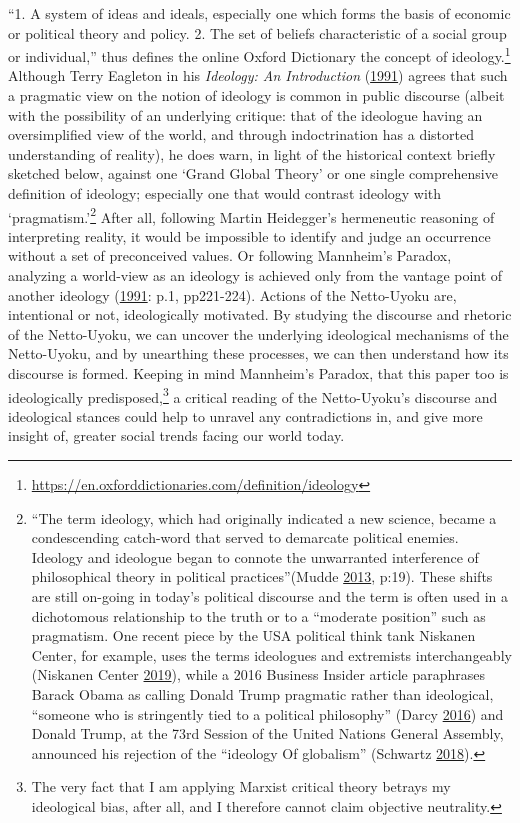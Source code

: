 \documentclass[10pt,british,A4paper,,openany]{memoir}
\begin{document}
``1. A system of ideas and ideals, especially one which forms the basis
of economic or political theory and policy. 2. The set of beliefs
characteristic of a social group or individual,'' thus defines the
online Oxford Dictionary the concept of ideology.\footnote{\url{https://en.oxforddictionaries.com/definition/ideology}}
Although Terry Eagleton in his \emph{Ideology: An Introduction}
(\protect\hyperlink{ref-eagleton_ideology:_1991}{1991}) agrees that such
a pragmatic view on the notion of ideology is common in public discourse
(albeit with the possibility of an underlying critique: that of the
ideologue having an oversimplified view of the world, and through
indoctrination has a distorted understanding of reality), he does warn,
in light of the historical context briefly sketched below, against one
`Grand Global Theory' or one single comprehensive definition of
ideology; especially one that would contrast ideology with
`pragmatism.'\footnote{``The term ideology, which had originally
  indicated a new science, became a condescending catch-word that served
  to demarcate political enemies. Ideology and ideologue began to
  connote the unwarranted interference of philosophical theory in
  political practices''(Mudde
  \protect\hyperlink{ref-mudde_oxford_2013}{2013}, p:19). These shifts
  are still on-going in today's political discourse and the term is
  often used in a dichotomous relationship to the truth or to a
  ``moderate position'' such as pragmatism. One recent piece by the USA
  political think tank Niskanen Center, for example, uses the terms
  ideologues and extremists interchangeably (Niskanen Center
  \protect\hyperlink{ref-niskanen_center_if_2019}{2019}), while a 2016
  Business Insider article paraphrases Barack Obama as calling Donald
  Trump pragmatic rather than ideological, ``someone who is stringently
  tied to a political philosophy'' (Darcy
  \protect\hyperlink{ref-darcy_obama_2016}{2016}) and Donald Trump, at
  the 73rd Session of the United Nations General Assembly, announced his
  rejection of the ``ideology Of globalism'' (Schwartz
  \protect\hyperlink{ref-schwartz_trump_2018}{2018}).} After all,
following Martin Heidegger's hermeneutic reasoning of interpreting
reality, it would be impossible to identify and judge an occurrence
without a set of preconceived values. Or following Mannheim's Paradox,
analyzing a world-view as an ideology is achieved only from the vantage
point of another ideology
(\protect\hyperlink{ref-eagleton_ideology:_1991}{1991}: p.1, pp221-224).
Actions of the Netto-Uyoku are, intentional or not, ideologically
motivated. By studying the discourse and rhetoric of the Netto-Uyoku, we
can uncover the underlying ideological mechanisms of the Netto-Uyoku,
and by unearthing these processes, we can then understand how its
discourse is formed. Keeping in mind Mannheim's Paradox, that this paper
too is ideologically predisposed,\footnote{The very fact that I am
  applying Marxist critical theory betrays my ideological bias, after
  all, and I therefore cannot claim objective neutrality.} a critical
reading of the Netto-Uyoku's discourse and ideological stances could
help to unravel any contradictions in, and give more insight of, greater
social trends facing our world today.
\end{document}
